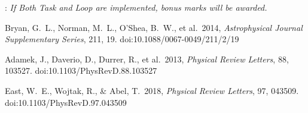 \documentclass[11pt]{amsart}
\begin{document}
: \textit{If Both Task and Loop are implemented, bonus marks will be awarded.}



\begin{thebibliography}{2}

 Bryan, G.~L., Norman, M.~L., O'Shea, B.~W., et al.\ 2014, \textit{Astrophysical Journal Supplementary Series}, 211, 19. doi:10.1088/0067-0049/211/2/19

 Adamek, J., Daverio, D., Durrer, R., et al.\ 2013, \textit{Physical Review Letters}, 88, 103527. doi:10.1103/PhysRevD.88.103527

 East, W.~E., Wojtak, R., \& Abel, T.\ 2018, \textit{Physical Review Letters}, 97, 043509. doi:10.1103/PhysRevD.97.043509

\end{thebibliography}
\end{document}
